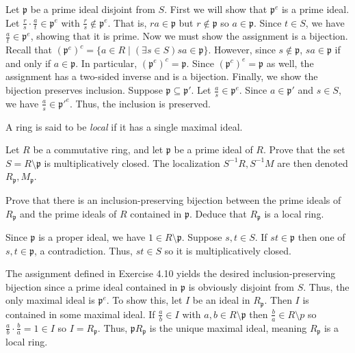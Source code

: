 \documentclass[../../master.tex]{subfiles}
\begin{document}
    \begin{solution}
        Let $\mathfrak{p}$ be a prime ideal disjoint from $S$. First we will
        show that $\mathfrak{p}^{e}$ is a prime ideal. Let $\frac{r}{s} \cdot
        \frac{a}{t} \in \mathfrak{p}^{e}$ with $\frac{r}{s} \notin
        \mathfrak{p}^{e}$. That is, $ra \in \mathfrak{p}$ but $r \notin
        \mathfrak{p}$ so $a \in \mathfrak{p}$. Since $t \in S$, we have
        $\frac{a}{t} \in \mathfrak{p}^{e}$, showing that it is prime. Now we
        must show the assignment is a bijection.
        Recall that
        $(\mathfrak{p}^{e})^{c} = \{a \in R \mid (\exists s \in S) sa \in
        \mathfrak{p}\}$. However, since $s \notin \mathfrak{p}$, $sa \in
        \mathfrak{p}$ if and only if $a \in \mathfrak{p}$. In particular,
        $(\mathfrak{p}^{e})^{c} = \mathfrak{p}$. Since $(\mathfrak{p}^{c})^{e} =
        \mathfrak{p}$ as well, the assignment has a two-sided inverse and is a
        bijection. Finally, we show the bijection preserves inclusion. Suppose
        $\mathfrak{p} \subseteq \mathfrak{p'}$. Let $\frac{a}{s} \in
        \mathfrak{p}^{e}$. Since $a \in \mathfrak{p'}$ and $s \in S$, we
        have $\frac{a}{s} \in \mathfrak{p'}^{e}$. Thus, the inclusion is
        preserved.
    \end{solution}

    \begin{problem}
        A ring is said to be \textit{local} if it has a single maximal ideal.

        Let $R$ be a commutative ring, and let $\mathfrak{p}$ be a prime ideal
        of $R$. Prove that the set $S = R \setminus \mathfrak{p}$ is
        multiplicatively closed. The localization $S^{-1}R, S^{-1}M$ are then
        denoted $R_{\mathfrak{p}}, M_{\mathfrak{p}}$.

        Prove that there is an inclusion-preserving bijection between the prime
        ideals of $R_{\mathfrak{p}}$ and the prime ideals of $R$ contained in
        $\mathfrak{p}$. Deduce that $R_{\mathfrak{p}}$ is a local ring.
    \end{problem}

    \begin{solution}
        Since $\mathfrak{p}$ is a proper ideal, we have $1 \in R \setminus
        \mathfrak{p}$. Suppose $s, t \in S$. If  $st \in \mathfrak{p}$ then one
        of $s, t \in \mathfrak{p}$, a contradiction. Thus, $st \in S$ so it is
        multiplicatively closed.

        The assignment defined in Exercise 4.10 yields the desired
        inclusion-preserving bijection since a prime ideal contained in
        $\mathfrak{p}$ is obviously disjoint from $S$. Thus, the only maximal
        ideal is $\mathfrak{p}^{e}$. To show this, let $I$ be an ideal in
        $R_{\mathfrak{p}}$. Then $I$ is contained in some maximal ideal. If
        $\frac{a}{b} \in I$ with $a, b \in R \setminus \mathfrak{p}$ then
        $\frac{b}{a} \in R \setminus p$ so $\frac{a}{b} \cdot \frac{b}{a} = 1
        \in I$ so $I = R_{\mathfrak{p}}$. Thus, $\mathfrak{p}R_{\mathfrak{p}}$ 
        is the unique maximal ideal, meaning $R_{\mathfrak{p}}$ is a local ring.
    \end{solution}
\end{document}
